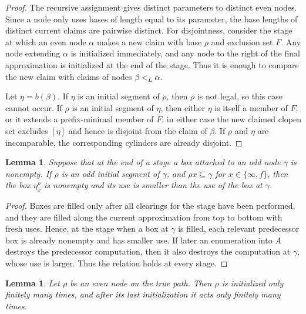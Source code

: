 \documentclass[11pt]{amsart}
\newtheorem{lemma}[theorem]{Lemma}
\begin{document}
\begin{proof}
The recursive assignment gives distinct parameters to distinct
even nodes. Since a node only uses bases of length
equal to its parameter, the base lengths of distinct current claims are
pairwise distinct.
For disjointness, consider the stage at which an even node $\alpha$ makes a new
claim with base $\rho$ and exclusion set $F$.  Any node extending $\alpha$ is
initialized immediately, and any node to the right of the final approximation
is initialized at the end of the stage.  Thus it is enough to compare the new
claim with claims of nodes $\beta<_L\alpha$.

Let $\eta=b(\beta)$.  If $\eta$ is an initial segment of $\rho$, then $\rho$ is
not legal, so this case cannot occur.  If $\rho$ is an initial segment of
$\eta$, then either $\eta$ is itself a member of $F$, or it extends a
prefix-minimal member of $F$; in either case the new claimed clopen set excludes
$[\eta]$ and hence is disjoint from the claim of $\beta$.  If $\rho$ and
$\eta$ are incomparable, the corresponding cylinders are already disjoint.
\end{proof}

\begin{lemma}\label{box-nesting-main}
Suppose that at the end of a stage a box attached to an odd node $\gamma$ is
nonempty.  If $\rho$ is an odd initial segment of $\gamma$, and
$\rho x\subseteq\gamma$ for $x\in\{\infty,f\}$, then the box $\eta_x^\rho$ is
nonempty and its use is smaller than the use of the box at $\gamma$.
\end{lemma}

\begin{proof}
Boxes are filled only after all clearings for the stage have been performed,
and they are filled along the current approximation from top to bottom with
fresh uses.  Hence, at the stage when a box at $\gamma$ is filled, each relevant
predecessor box is already nonempty and has smaller use.  If later an
enumeration into $A$ destroys the predecessor computation, then it also destroys
the computation at $\gamma$, whose use is larger.  Thus the relation holds at
every stage.
\end{proof}

\begin{lemma}\label{finite-injury-main}
Let $\rho$ be an even node on the true path. Then $\rho$ is initialized only finitely many times, and after its last initialization it acts only finitely many
times.
\end{lemma}
\end{document}

